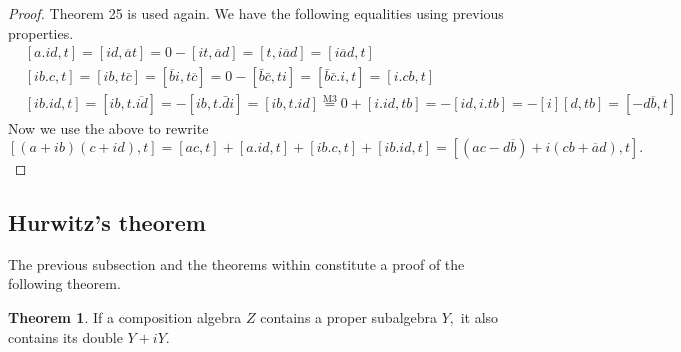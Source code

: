 \documentclass[11pt]{report}
\theoremstyle{plain}
\theoremstyle{definition}
\newtheorem{theorem}{Theorem}
\begin{document}
\begin{proof}
Theorem 25 is used again.
	We have the following equalities using previous properties.
	\begin{align}
		&[a.id,t] = [id,\overline{a}t] = 0 - [it,\overline{a}d] = [t,i\overline{a}d] =[i\overline{a}d,t]\\
		&[ib.c,t] = [ib,t\overline{c}] = [\overline{b}i,t\overline{c}] = 0 - [\bar{b}\bar{c},ti] = [\bar{b}\bar{c}.i,t] = [i.cb,t]\\
		&[ib.id,t] = [ib,t.\overline{id}] = -[ib,t.\bar{d}i] = [ib,t.id] \stackrel{\text{M3}}{=} 0 + [i.id,tb] = -[id,i.tb] = -[i][d,tb] = [-d\overline{b},t]
	\end{align}
	Now we use the above to rewrite 
	$$ [(a+ib)(c+id),t] = [ac,t] +[a.id,t] + [ib.c,t]  +[ib.id,t] = [(ac-d\overline{b}) + i(cb + \overline{a}d),t]. $$
\end{proof}
\subsection{Hurwitz's theorem}
The previous subsection and the theorems within constitute a proof of the following theorem.
\begin{theorem}
	If a composition algebra $ Z $ contains a proper subalgebra $ Y, $ it also contains its  double $ Y+iY. $
\end{theorem}
\end{document}
